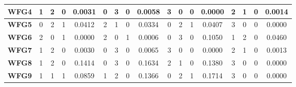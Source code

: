 \begin{table*}[t]
{\begin{tabular}{c|c|c|c|c|c|c|c|c|c|c|c|c|c|c|c|c|}
\multicolumn{1}{|c|}{\textbf{WFG4}}  & 1                   & 2                     & 0                          & 0.0031          & 0                   & 3                     & 0                          & 0.0058          & 3                   & 0                     & 0                          & 0.0000          & 2                   & 1                     & 0                          & 0.0014          \\ \hline
\multicolumn{1}{|c|}{\textbf{WFG5}}  & 0                   & 2                     & 1                          & 0.0412          & 2                   & 1                     & 0                          & 0.0334          & 0                   & 2                     & 1                          & 0.0407          & 3                   & 0                     & 0                          & 0.0000          \\ \hline
\multicolumn{1}{|c|}{\textbf{WFG6}}  & 2                   & 0                     & 1                          & 0.0000          & 2                   & 0                     & 1                          & 0.0006          & 0                   & 3                     & 0                          & 0.1050          & 1                   & 2                     & 0                          & 0.0460          \\ \hline
\multicolumn{1}{|c|}{\textbf{WFG7}}  & 1                   & 2                     & 0                          & 0.0030          & 0                   & 3                     & 0                          & 0.0065          & 3                   & 0                     & 0                          & 0.0000          & 2                   & 1                     & 0                          & 0.0013          \\ \hline
\multicolumn{1}{|c|}{\textbf{WFG8}}  & 1                   & 2                     & 0                          & 0.1414          & 0                   & 3                     & 0                          & 0.1634          & 2                   & 1                     & 0                          & 0.1380          & 3                   & 0                     & 0                          & 0.0000          \\ \hline
\multicolumn{1}{|c|}{\textbf{WFG9}}  & 1                   & 1                     & 1                          & 0.0859          & 1                   & 2                     & 0                          & 0.1366          & 0                   & 2                     & 1                          & 0.1714          & 3                   & 0                     & 0                          & 0.0000          \\ \hline

\end{tabular}}
\end{table*}
